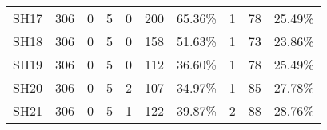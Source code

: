\documentclass[10pt,letterpaper,oneside]{article}
\begin{document}
\begin{table}[ht]
\begin{tabular}{llllp{1.9cm}lllll}
			SH17    & 306   & 0    & 5    & 0    & 200      & 65.36\%  & 1     & 78        & 25.49\%   \\ 
			SH18    & 306   & 0    & 5    & 0    & 158      & 51.63\%  & 1     & 73        & 23.86\%   \\ 
			SH19    & 306   & 0    & 5    & 0    & 112      & 36.60\%  & 1     & 78        & 25.49\%   \\ 
			SH20    & 306   & 0    & 5    & 2    & 107      & 34.97\%  & 1     & 85        & 27.78\%   \\ 
			SH21    & 306   & 0    & 5    & 1    & 122      & 39.87\%  & 2     & 88        & 28.76\%   \\ \hline
		\end{tabular}
	\end{table}
\end{document}

